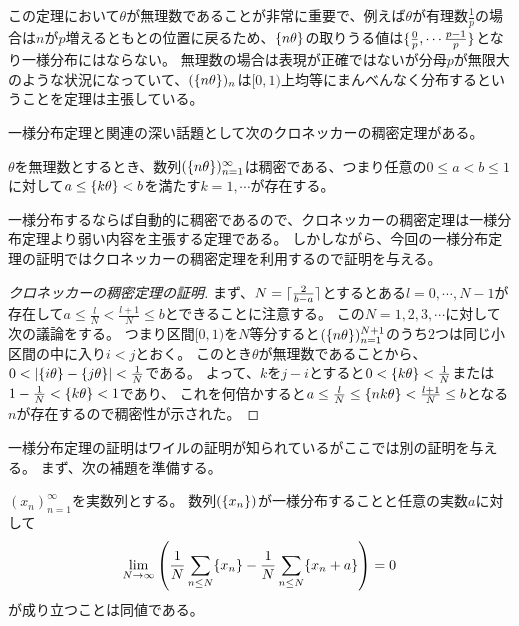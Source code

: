 この定理において$\theta$が無理数であることが非常に重要で、例えば$\theta$が有理数$\frac{1}{p}$の場合は$n$が$p$増えるともとの位置に戻るため、$\{n\theta\}$の取りうる値は$\{ \frac{0}{p}, \cdots \frac{p-1}{p} \}$となり一様分布にはならない。
無理数の場合は表現が正確ではないが分母$p$が無限大のような状況になっていて、$(\{n\theta\})_n$は$[0, 1)$上均等にまんべんなく分布するということを定理は主張している。

一様分布定理と関連の深い話題として次のクロネッカーの稠密定理がある。

\begin{theorem}[クロネッカーの稠密定理]
$\theta$を無理数とするとき、数列$(\{n\theta\})_{n = 1}^\infty$は稠密である、つまり任意の$0 \le a < b \le 1$に対して$a \le \{k\theta\} < b$を満たす$k = 1, \cdots$が存在する。
\end{theorem}

一様分布するならば自動的に稠密であるので、クロネッカーの稠密定理は一様分布定理より弱い内容を主張する定理である。
しかしながら、今回の一様分布定理の証明ではクロネッカーの稠密定理を利用するので証明を与える。

\begin{proof}[クロネッカーの稠密定理の証明]
まず、$N = \lceil\frac{2}{b-a}\rceil$とするとある$l = 0, \cdots, N-1$が存在して$a \le \frac{l}{N} < \frac{l+1}{N} \le b$とできることに注意する。
この$N = 1, 2, 3, \cdots$に対して次の議論をする。
つまり区間$[0, 1)$を$N$等分すると$(\{n\theta\})_{n = 1}^{N+1}$のうち$2$つは同じ小区間の中に入り$i < j$とおく。
このとき$\theta$が無理数であることから、$0 < |\{i\theta\}-\{j\theta\}| < \frac{1}{N}$である。
よって、$k$を$j-i$とすると$0 < \{k\theta\} < \frac{1}{N}$または$1-\frac{1}{N} < \{k\theta\} < 1$であり、
これを何倍かすると$a \le \frac{l}{N} \le \{nk\theta\} < \frac{l+1}{N} \le b$となる$n$が存在するので稠密性が示された。
\end{proof}

一様分布定理の証明はワイルの証明が知られているがここでは別の証明を与える。
まず、次の補題を準備する。

\begin{lemma}
$(x_n)_{n = 1}^\infty$を実数列とする。
数列$(\{x_n\})$が一様分布することと任意の実数$a$に対して
$$
\lim_{N \to \infty}\qty(\frac{1}{N}\sum_{n \le N}\{x_n\}-\frac{1}{N}\sum_{n \le N}\{x_n+a\}) = 0
$$
が成り立つことは同値である。
\end{lemma}


